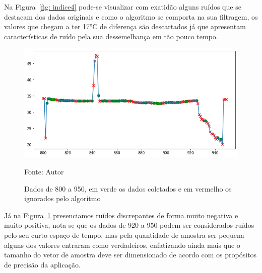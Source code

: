 Na Figura~\ref{fig: indice4} pode-se visualizar com exatidão alguns ruídos que se destacam dos dados originais e como o algoritmo se comporta na sua filtragem, os valores que chegam a ter \ang{17}C de diferença são descartados já que apresentam características de ruído pela sua dessemelhança em tão pouco tempo.

\begin{figure}[H]
	\centering
	\includegraphics[width=15cm]{imagens/sensores/indice3.png}
	\caption{Dados de 800 a 950, em verde os dados coletados e em vermelho os ignorados pelo algoritmo}
	Fonte: Autor
	\label{fig: indice3}
\end{figure}

Já na Figura~\ref{fig: indice3} presenciamos ruídos discrepantes de forma muito negativa e muito positiva, nota-se que os dados de 920 a 950 podem ser considerados ruídos pelo seu curto espaço de tempo, mas pela quantidade de amostra ser pequena alguns dos valores entraram como verdadeiros, enfatizando ainda mais que o tamanho do vetor de amostra deve ser dimensionado de acordo com os propósitos de precisão da aplicação.

